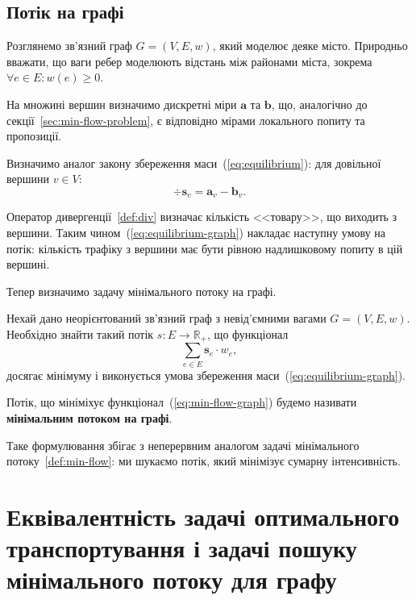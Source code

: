 \subsection{Потік на графі}
Розглянемо зв'язний граф $G = (V, E, w)$, який моделює деяке місто.
Природньо вважати, що ваги ребер моделюють відстань між районами міста, зокрема $\forall e \in E: w(e) \ge 0$.

На множині вершин визначимо дискретні міри $\mathbf a$ та $\mathbf b$, що, аналогічно до секції~\ref{sec:min-flow-problem}, є
відповідно мірами локального попиту та пропозиції.

Визначимо аналог закону збереження маси~(\ref{eq:equilibrium}): для довільної вершини $v \in V$:
\begin{equation}
    \label{eq:equilibrium-graph}
    \div{\mathbf{s}}_v = \mathbf{a}_v - \mathbf{b}_v.
\end{equation}

Оператор дивергенції~\ref{def:div} визначає кількість <<товару>>, що виходить з вершини.
Таким чином~(\ref{eq:equilibrium-graph}) накладає наступну умову на потік: кількість трафіку з вершини має бути рівною
надлишковому попиту в цій вершині.

Тепер визначимо задачу мінімального потоку на графі.

\begin{definition}
    Нехай дано неорієнтований зв'язний граф з невід'ємними вагами $G = (V, E, w)$. Необхідно знайти такий потік
    $s : E \to \mathbb{R}_+$, що функціонал
    \begin{equation}
        \label{eq:min-flow-graph}
        \sum_{e \in E} \mathbf{s}_e \cdot w_e,
    \end{equation}
    досягає мінімуму і виконується умова збереження маси~(\ref{eq:equilibrium-graph}). 

    Потік, що мініміхує функціонал~(\ref{eq:min-flow-graph}) будемо називати \textbf{мінімальним потоком на графі}.
\end{definition}

Таке формулювання збігає з неперервним аналогом задачі мінімального потоку~\ref{def:min-flow}: ми шукаємо потік, який
мінімізує сумарну інтенсивність. 

\section{Еквівалентність задачі оптимального транспортування і задачі пошуку мінімального потоку для графу}

